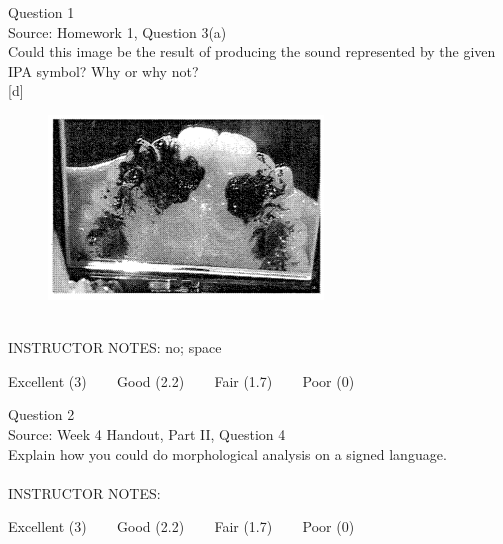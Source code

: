 \documentclass[12pt]{article}
\begin{document}
{\large Question 1}\\

Source: Homework 1, Question 3(a)\\

Could this image be the result of producing the sound represented by the given IPA symbol? Why or why not?\\

{[d]}

\begin{figure}[H]
\includegraphics{../images/staticpalatography_fricative.png}
\end{figure}

~\\
INSTRUCTOR NOTES: no; space


\vfill
Excellent (3) ~~~ Good (2.2) ~~~ Fair (1.7) ~~~ Poor (0)
\newpage

{\large Question 2}\\

Source: Week 4 Handout, Part II, Question 4\\

Explain how you could do morphological analysis on a signed language.\\


~\\
INSTRUCTOR NOTES: 


\vfill
Excellent (3) ~~~ Good (2.2) ~~~ Fair (1.7) ~~~ Poor (0)
\newpage

\begin{center}
\textbf{{\color{red}{\HUGE END OF EXAM}}}\\

\end{center}
\newpage
\end{document}

